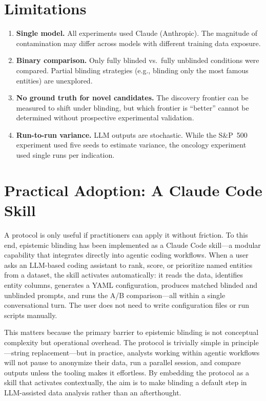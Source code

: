 \documentclass[sigconf, nonacm]{acmart}
\begin{document}
\section{Limitations}

\begin{enumerate}
\item \textbf{Single model.} All experiments used Claude (Anthropic). The magnitude of contamination may differ across models with different training data exposure.
\item \textbf{Binary comparison.} Only fully blinded vs.\ fully unblinded conditions were compared. Partial blinding strategies (e.g., blinding only the most famous entities) are unexplored.
\item \textbf{No ground truth for novel candidates.} The discovery frontier can be measured to shift under blinding, but which frontier is ``better'' cannot be determined without prospective experimental validation.
\item \textbf{Run-to-run variance.} LLM outputs are stochastic. While the S\&P~500 experiment used five seeds to estimate variance, the oncology experiment used single runs per indication.
\end{enumerate}

\section{Practical Adoption: A Claude Code Skill}

A protocol is only useful if practitioners can apply it without friction. To this end, epistemic blinding has been implemented as a Claude Code skill---a modular capability that integrates directly into agentic coding workflows. When a user asks an LLM-based coding assistant to rank, score, or prioritize named entities from a dataset, the skill activates automatically: it reads the data, identifies entity columns, generates a YAML configuration, produces matched blinded and unblinded prompts, and runs the A/B comparison---all within a single conversational turn. The user does not need to write configuration files or run scripts manually.

This matters because the primary barrier to epistemic blinding is not conceptual complexity but operational overhead. The protocol is trivially simple in principle---string replacement---but in practice, analysts working within agentic workflows will not pause to anonymize their data, run a parallel session, and compare outputs unless the tooling makes it effortless. By embedding the protocol as a skill that activates contextually, the aim is to make blinding a default step in LLM-assisted data analysis rather than an afterthought.
\end{document}
